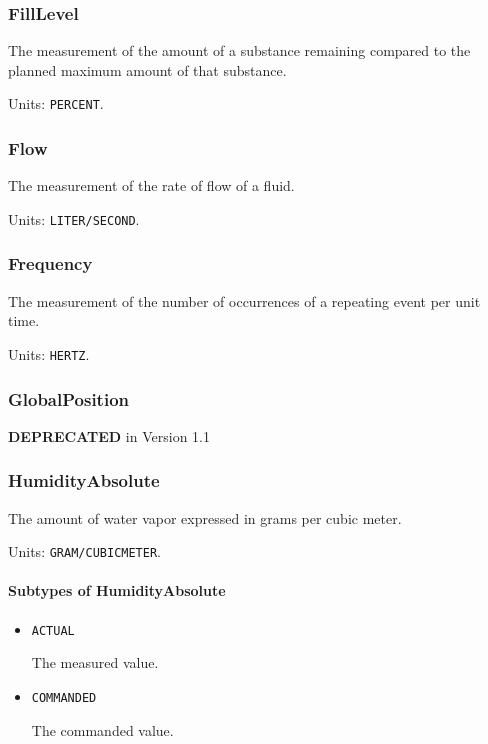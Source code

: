 \subsubsection{FillLevel}
\label{sec:FillLevel}



The measurement of the amount of a substance remaining compared to the planned maximum amount of that substance.


Units: \texttt{PERCENT}.

\subsubsection{Flow}
\label{sec:Flow}



The measurement of the rate of flow of a fluid.


Units: \texttt{LITER/SECOND}.

\subsubsection{Frequency}
\label{sec:Frequency}



The measurement of the number of occurrences of a repeating event per unit time.


Units: \texttt{HERTZ}.

\subsubsection{GlobalPosition}
\label{sec:GlobalPosition}



\textbf{DEPRECATED} in Version 1.1


\subsubsection{HumidityAbsolute}
\label{sec:HumidityAbsolute}



The amount of water vapor expressed in grams per cubic meter.


Units: \texttt{GRAM/CUBIC\textunderscore METER}.

\paragraph{Subtypes of HumidityAbsolute}\mbox{}
\label{sec:Subtypes of HumidityAbsolute}

\begin{itemize}

\item \texttt{ACTUAL}


The measured value.

\item \texttt{COMMANDED}


The commanded value.


\end{itemize}

